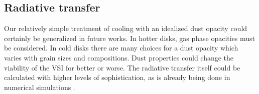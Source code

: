 %
%

\subsection{Radiative transfer} 
Our relatively simple treatment of cooling with an idealized dust opacity
could certainly be generalized in future works.  In hotter disks, gas phase opacities
must be considered.   In cold disks there are many choices for a dust opacity which 
varies with grain sizes and compositions. Dust properties could change the viability 
of the VSI for better or worse.  The radiative transfer itself
could be calculated with higher levels of sophistication, as is already being done in
numerical simulations \citep{stoll14}.


